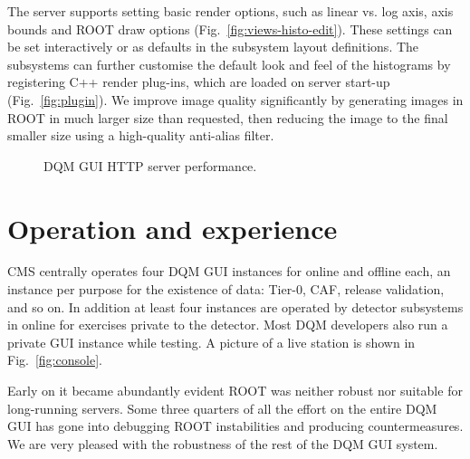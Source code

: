 \documentclass[a4paper]{jpconf}
\begin{document}
The server supports setting basic render options, such as linear
vs. log axis, axis bounds and ROOT draw options
(Fig.~\ref{fig:views-histo-edit}).  These settings can be set
interactively or as defaults in the subsystem layout definitions.  The
subsystems can further customise the default look and feel of the
histograms by registering C++ render plug-ins, which are loaded on
server start-up (Fig.~\ref{fig:plugin}).  We improve image quality
significantly by generating images in ROOT in much larger size than
requested, then reducing the image to the final smaller size using a
high-quality anti-alias filter.


\begin{figure}[!b]
\begin{center}
\hfill
{}\hfill
\end{center}
\caption{\label{fig:performance}DQM GUI HTTP server performance.}
\end{figure}

\section{Operation and experience}

CMS centrally operates four DQM GUI instances for online and offline
each, an instance per purpose for the existence of data: Tier-0, CAF,
release validation, and so on.  In addition at least four instances
are operated by detector subsystems in online for exercises private to
the detector.  Most DQM developers also run a private GUI instance
while testing.  A picture of a live station is shown in
Fig.~\ref{fig:console}.

Early on it became abundantly evident ROOT was neither robust nor
suitable for long-running servers.  Some three quarters of all the
effort on the entire DQM GUI has gone into debugging ROOT
instabilities and producing countermeasures.  We are very pleased with
the robustness of the rest of the DQM GUI system.
\end{document}
